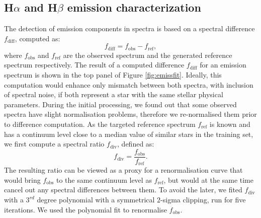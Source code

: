 \subsection{H$\alpha$ and H$\beta$ emission characterization}
\label{sec:hahbemis}
The detection of emission components in spectra is based on a spectral difference $f_\mathrm{diff}$, computed as:
\begin{equation}
\label{equ:spec_diff}
f_\mathrm{diff} = f_\mathrm{obs} - f_\mathrm{ref},
\end{equation}
where $f_\mathrm{obs}$ and $f_\mathrm{ref}$ are the observed spectrum and the generated reference spectrum respectively. The result of a computed difference $f_\mathrm{diff}$ for an emission spectrum is shown in the top panel of Figure \ref{fig:emissfit}. Ideally, this computation would enhance only mismatch between both spectra, with inclusion of spectral noise, if both represent a star with the same stellar physical parameters. During the initial processing, we found out that some observed spectra have slight normalisation problems, therefore we re-normalised them prior to difference computation. As the targeted reference spectrum $f_\mathrm{ref}$ is known and has a continuum level close to a median value of similar stars in the training set, we first compute a spectral ratio $f_\mathrm{div}$, defined as:
\begin{equation}
\label{equ:spec_div}
f_\mathrm{div} = \frac{f_\mathrm{obs}}{f_\mathrm{ref}}.
\end{equation}
The resulting ratio can be viewed as a proxy for a renormalisation curve that would bring $f_\mathrm{obs}$ to the same continuum level as $f_\mathrm{ref}$, but would at the same time cancel out any spectral differences between them. To avoid the later, we fited $f_\mathrm{div}$ with a $3^{rd}$ degree polynomial with a symmetrical $2$-sigma clipping, run for five iterations. We used the polynomial fit to renormalise $f_\mathrm{obs}$.

